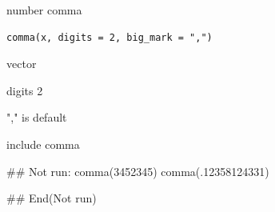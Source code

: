 \documentclass[a4paper]{book}
\begin{document}
%
\begin{Description}
number comma
\end{Description}
%
\begin{Usage}
\begin{verbatim}
comma(x, digits = 2, big_mark = ",")
\end{verbatim}
\end{Usage}
%
\begin{Arguments}
\begin{ldescription}
\item[\code{x}] vector

\item[\code{digits}] digits 2

\item[\code{big\_mark}] "," is default
\end{ldescription}
\end{Arguments}
%
\begin{Value}
include comma
\end{Value}
%
\begin{Examples}
\begin{ExampleCode}

\#\# Not run: 
comma(3452345)
comma(.12358124331)

## End(Not run)
\end{ExampleCode}
\end{Examples}
\end{document}
